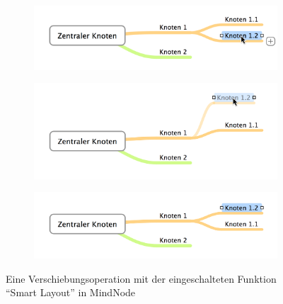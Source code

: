 
\begin{figure}[hbt]
    \newcommand{\subfigurewidth}{\textwidth}
    \newcommand{\graphicswidth}{0.7\linewidth}
    \begin{subfigure}{\subfigurewidth}
        \centering
        \includegraphics[width=\graphicswidth]{resources/mindnode-smart-layout-a}
        \caption{}
        \label{fig:mindnode-smart-layout-a}
    \end{subfigure}
    \begin{subfigure}{\subfigurewidth}
        \centering
        \includegraphics[width=\graphicswidth]{resources/mindnode-smart-layout-b}
        \caption{}
        \label{fig:mindnode-smart-layout-b}
    \end{subfigure}
    \begin{subfigure}{\subfigurewidth}
        \centering
        \includegraphics[width=\graphicswidth]{resources/mindnode-smart-layout-c}
        \caption{}
        \label{fig:mindnode-smart-layout-c}
    \end{subfigure}
    \caption{Eine Verschiebungsoperation mit der eingeschalteten Funktion \enquote{Smart Layout} in MindNode}
    \label{fig:mindnode-smart-layout}
\end{figure}

